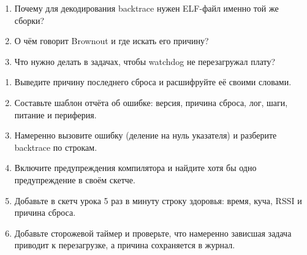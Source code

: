 \begin{selfcheck}
\begin{enumerate}
  \item Почему для декодирования backtrace нужен ELF-файл именно той же сборки?
  \item О чём говорит Brownout и где искать его причину?
  \item Что нужно делать в задачах, чтобы watchdog не перезагружал плату?
\end{enumerate}
\end{selfcheck}

\begin{tasks}
\begin{enumerate}
\item {} Выведите причину последнего сброса и расшифруйте её своими словами.
\item {} Составьте шаблон отчёта об ошибке: версия, причина сброса, лог, шаги, питание и периферия.
\item {} Намеренно вызовите ошибку (деление на нуль указателя) и разберите backtrace по строкам.
\item {} Включите предупреждения компилятора и найдите хотя бы одно предупреждение в своём скетче.
\item {} Добавьте в скетч урока 5 раз в минуту строку здоровья: время, куча, RSSI и причина сброса.
\item {} Добавьте сторожевой таймер и проверьте, что намеренно зависшая задача приводит к перезагрузке, а причина сохраняется в журнал.
\end{enumerate}
\end{tasks}
